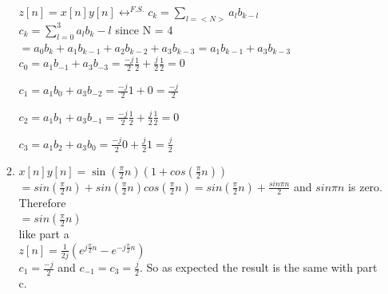 \documentclass[10pt,a4paper, margin=1in]{article}
\begin{document}
\begin{enumerate}
\begin{enumerate}
    $z[n] = x[n]y[n] \longleftrightarrow^{F.S.} c_k = \sum_{l=<N>}a_l b_{k-l}$ \\

    $c_k = \sum_{l = 0}^{3}a_l b_k-l$ since N = 4 \\

    $=a_0 b_k + a_1 b_{k-1} + a_2 b_{k-2} + a_3 b_{k-3} = a_1 b_{k-1} + a_3 b_{k-3}$ \\

    $c_0 = a_1 b_{-1} + a_3 b_{-3} = \frac{-j}{2}\frac{1}{2} + \frac{j}{2}\frac{1}{2} = 0$

    $c_1 = a_1 b_{0} + a_3 b_{-2} = \frac{-j}{2}1 + 0 = \frac{-j}{2}$

    $c_2 = a_1 b_{1} + a_3 b_{-1} = \frac{-j}{2}\frac{1}{2} + \frac{j}{2}\frac{1}{2} = 0$

    $c_3 = a_1 b_{2} + a_3 b_{0} = \frac{-j}{2}0 + \frac{j}{2}1 = \frac{j}{2}$
	\item %
	$x[n]y[n] = \sin(\frac{\pi}{2}n)(1 + cos(\frac{\pi}{2}n))$ \\

    $= sin(\frac{\pi}{2}n) + sin(\frac{\pi}{2}n) cos(\frac{\pi}{2}n) = sin(\frac{\pi}{2}n) + \frac{sin\pi n}{2}$ and $ sin\pi n$ is zero. Therefore \\

    $= sin(\frac{\pi}{2}n)$\\

    like part a\\

    $z[n] = \frac{1}{2j}(e^{j\frac{\pi}{2}n} - e^{-j\frac{\pi}{2}n})$\\

    $c_1 = \frac{-j}{2}$ and $c_{-1} = c_{3} = \frac{j}{2}$. So as expected the result is the same with part c.
    \end{enumerate}    
    

\end{enumerate}
\end{document}
